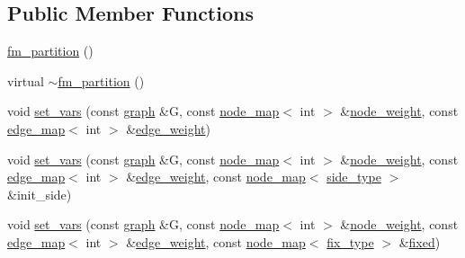 \subsection*{Public Member Functions}
\begin{DoxyCompactItemize}
\item 
\mbox{\hyperlink{classfm__partition_a69f37c22abf6df5b3778623512240106}{fm\+\_\+partition}} ()
\item 
virtual \mbox{\hyperlink{classfm__partition_ab9d4f12de8f65d42240d94f7924fb319}{$\sim$fm\+\_\+partition}} ()
\item 
void \mbox{\hyperlink{classfm__partition_aa15471da2b6a0f14060b0c4091c6b05c}{set\+\_\+vars}} (const \mbox{\hyperlink{classgraph}{graph}} \&G, const \mbox{\hyperlink{classnode__map}{node\+\_\+map}}$<$ int $>$ \&\mbox{\hyperlink{classfm__partition_ae1ba643b4bd6721075ab7b608bcf3cd6}{node\+\_\+weight}}, const \mbox{\hyperlink{classedge__map}{edge\+\_\+map}}$<$ int $>$ \&\mbox{\hyperlink{classfm__partition_adfe6147ba3f9c785f613b472f950595f}{edge\+\_\+weight}})
\item 
void \mbox{\hyperlink{classfm__partition_af4d1b1275050cc7f4327500cec1f6e88}{set\+\_\+vars}} (const \mbox{\hyperlink{classgraph}{graph}} \&G, const \mbox{\hyperlink{classnode__map}{node\+\_\+map}}$<$ int $>$ \&\mbox{\hyperlink{classfm__partition_ae1ba643b4bd6721075ab7b608bcf3cd6}{node\+\_\+weight}}, const \mbox{\hyperlink{classedge__map}{edge\+\_\+map}}$<$ int $>$ \&\mbox{\hyperlink{classfm__partition_adfe6147ba3f9c785f613b472f950595f}{edge\+\_\+weight}}, const \mbox{\hyperlink{classnode__map}{node\+\_\+map}}$<$ \mbox{\hyperlink{classfm__partition_a7cdff1bea3740a287387e8408e16ca79}{side\+\_\+type}} $>$ \&init\+\_\+side)
\item 
void \mbox{\hyperlink{classfm__partition_ad0bebf48731e99fbf7a8c6526ab0f9a6}{set\+\_\+vars}} (const \mbox{\hyperlink{classgraph}{graph}} \&G, const \mbox{\hyperlink{classnode__map}{node\+\_\+map}}$<$ int $>$ \&\mbox{\hyperlink{classfm__partition_ae1ba643b4bd6721075ab7b608bcf3cd6}{node\+\_\+weight}}, const \mbox{\hyperlink{classedge__map}{edge\+\_\+map}}$<$ int $>$ \&\mbox{\hyperlink{classfm__partition_adfe6147ba3f9c785f613b472f950595f}{edge\+\_\+weight}}, const \mbox{\hyperlink{classnode__map}{node\+\_\+map}}$<$ \mbox{\hyperlink{classfm__partition_a63693cd93d587dca3d1842f831cd1c55}{fix\+\_\+type}} $>$ \&\mbox{\hyperlink{classfm__partition_a3b04658dbb5b27ddd20194ff74a71082}{fixed}})
\item 

\end{DoxyCompactItemize}
